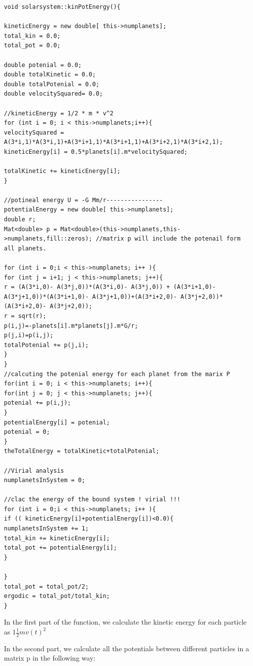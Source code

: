 \documentclass[10pt,a4paper]{article}
\begin{document}
\begin{lstlisting}
void solarsystem::kinPotEnergy(){

kineticEnergy = new double[ this->numplanets];
total_kin = 0.0;
total_pot = 0.0;

double potenial = 0.0;
double totalKinetic = 0.0;
double totalPotenial = 0.0;
double velocitySquared= 0.0;

//kineticEnergy = 1/2 * m * v^2
for (int i = 0; i < this->numplanets;i++){
velocitySquared = A(3*i,1)*A(3*i,1)+A(3*i+1,1)*A(3*i+1,1)+A(3*i+2,1)*A(3*i+2,1);
kineticEnergy[i] = 0.5*planets[i].m*velocitySquared;

totalKinetic += kineticEnergy[i];
}

//potineal energy U = -G Mm/r----------------
potentialEnergy = new double[ this->numplanets];
double r;
Mat<double> p = Mat<double>(this->numplanets,this->numplanets,fill::zeros); //matrix p will include the potenail form all planets.

for (int i = 0;i < this->numplanets; i++ ){
for (int j = i+1; j < this->numplanets; j++){
r = (A(3*i,0)- A(3*j,0))*(A(3*i,0)- A(3*j,0)) + (A(3*i+1,0)- A(3*j+1,0))*(A(3*i+1,0)- A(3*j+1,0))+(A(3*i+2,0)- A(3*j+2,0))*(A(3*i+2,0)- A(3*j+2,0));
r = sqrt(r);
p(i,j)=-planets[i].m*planets[j].m*G/r;
p(j,i)=p(i,j);
totalPotenial += p(j,i);
}
}
//calcuting the potenial energy for each planet from the marix P
for(int i = 0; i < this->numplanets; i++){
for(int j = 0; j < this->numplanets; j++){
potenial += p(i,j);
}
potentialEnergy[i] = potenial;
potenial = 0;
}
theTotalEnergy = totalKinetic+totalPotenial;

//Virial analysis
numplanetsInSystem = 0;

//clac the energy of the bound system ! virial !!!
for (int i = 0;i < this->numplanets; i++ ){
if (( kineticEnergy[i]+potentialEnergy[i])<0.0){
numplanetsInSystem += 1;
total_kin += kineticEnergy[i];
total_pot += potentialEnergy[i];
}

}
total_pot = total_pot/2;
ergodic = total_pot/total_kin;
}
\end{lstlisting}
In the first part of the function, we calculate the kinetic energy for each particle as $1 \frac{1}{2}m v(t)^2 $

In the second part, we calculate all the potentials between different particles in a matrix p in the following way:
\end{document}
